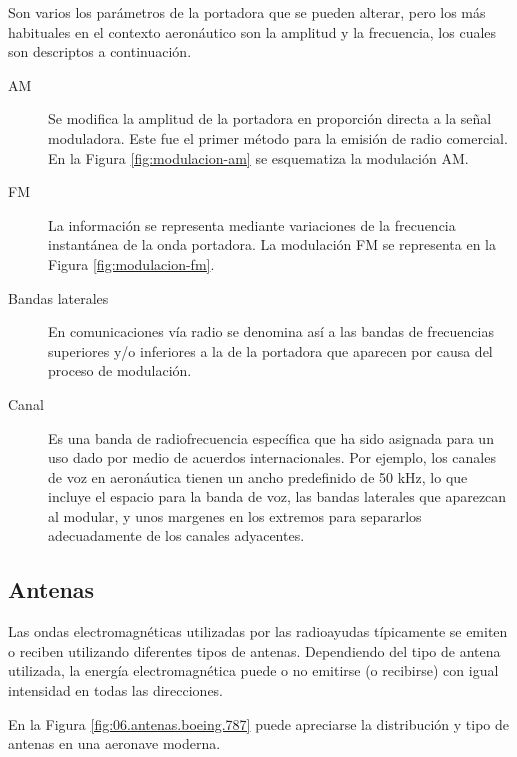 Son varios los par\'ametros de la portadora que se pueden alterar, pero los m\'as habituales en el contexto aeron\'autico son la amplitud y la frecuencia, los cuales son descriptos a continuaci\'on.

\begin{description}

\item [AM] Se modifica la amplitud de la portadora en proporci\'on directa a la se\~nal moduladora. Este fue el primer m\'etodo para la emisi\'on de radio comercial. En la Figura \ref{fig:modulacion-am} se esquematiza la modulaci\'on AM.


\item [FM]La informaci\'on se representa mediante variaciones de la frecuencia instant\'anea de la onda portadora.
La modulaci\'on FM se representa en la Figura \ref{fig:modulacion-fm}.


\item [Bandas laterales] En comunicaciones v\'ia radio se denomina as\'i a las bandas de frecuencias su\-pe\-rio\-res y/o inferiores a la de la portadora que aparecen por causa del proceso de modulaci\'on.


\item [Canal] Es una banda de radiofrecuencia espec\'ifica que ha sido asignada para un uso dado por medio de acuerdos internacionales. Por ejemplo, los canales de voz en aeron\'autica tienen un ancho predefinido de 50 kHz, lo que incluye el espacio para la banda de voz, las bandas laterales que aparezcan al modular, y unos margenes en los extremos para separarlos adecuadamente de los canales adyacentes.  

\end{description}

\subsection{Antenas}
\label{sec:06.Antenas}

Las ondas electromagn\'eticas
  utilizadas por las radioayudas t\'ipicamente se emiten o reciben
  utilizando diferentes tipos de antenas. Dependiendo del tipo de
  antena utilizada, la energ\'ia electromagn\'etica puede o no
  emitirse (o recibirse) con igual intensidad en todas las
  direcciones.
  
En la Figura \ref{fig:06.antenas.boeing.787} puede apreciarse la distribuci\'on y tipo de antenas en una aeronave 
moderna.


